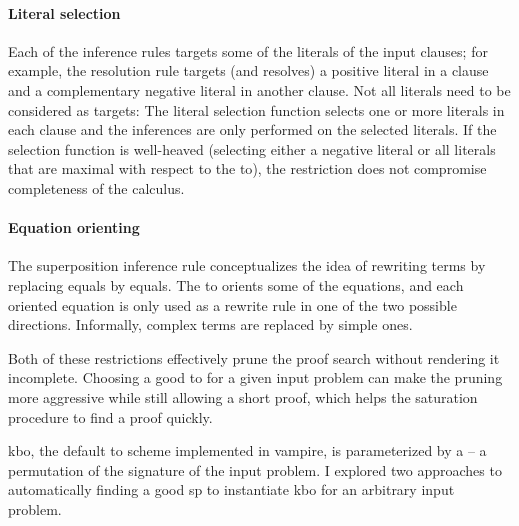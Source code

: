 \paragraph{Literal selection}
Each of the inference rules targets some of the literals of the input clauses;
for example, the resolution rule targets (and resolves) a positive literal in a clause and a complementary negative literal in another clause.
Not all literals need to be considered as targets:
The literal selection function selects one or more literals in each clause
and the inferences are only performed on the selected literals.
If the selection function is well-heaved
(selecting either a negative literal
or all literals that are maximal with respect to the \gls{to}),
the restriction does not compromise completeness of the calculus.

\paragraph{Equation orienting}
The superposition inference rule conceptualizes the idea of rewriting terms by replacing equals by equals.
The \gls{to} orients some of the equations, and each oriented equation is only used as a rewrite rule in one of the two possible directions.
Informally, complex terms are replaced by simple ones.

Both of these restrictions effectively prune the proof search without rendering it incomplete.
Choosing a good \gls{to} for a given input problem
can make the pruning more aggressive while still allowing a short proof,
which helps the saturation procedure to find a proof quickly.

\Gls{kbo}, the default \gls{to} scheme implemented in \gls{vampire}, is parameterized by a  -- a permutation of the \gls{signature} of the input problem.
I explored two approaches to automatically finding a good \gls{sp} to instantiate \gls{kbo} for an arbitrary input problem.

